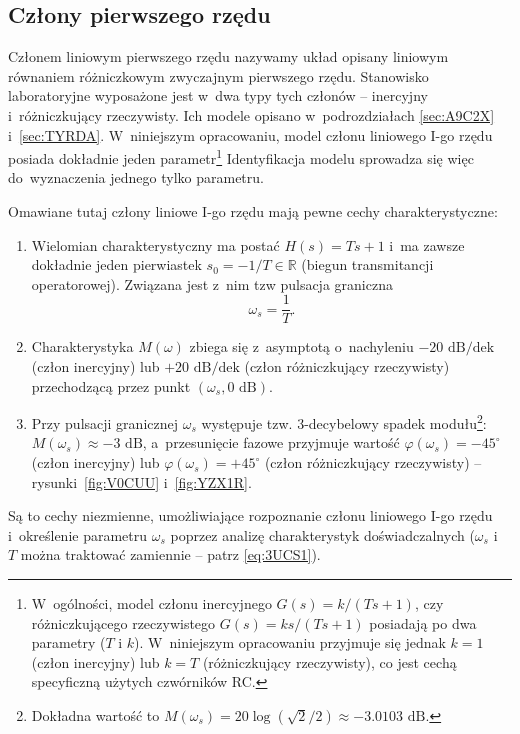 \documentclass[paper=a4,DIV=12]{lpas}
\newcommand{\degree}{^{\circ}}
\begin{document}
\begin{appendices}
  \subsection{Człony pierwszego rzędu}
  \label{sec:LDB7J}

  Członem liniowym pierwszego rzędu nazywamy układ opisany liniowym równaniem
  różniczkowym zwyczajnym pierwszego rzędu. Stanowisko laboratoryjne wyposażone
  jest w~dwa typy tych członów -- inercyjny i~różniczkujący rzeczywisty. Ich
  modele opisano w~podrozdziałach \ref{sec:A9C2X} i~\ref{sec:TYRDA}.
  W~niniejszym opracowaniu, model członu liniowego I-go rzędu posiada dokładnie
  jeden parametr\footnote{W~ogólności, model członu inercyjnego $G(s) = k/(Ts +
  1)$, czy różniczkującego rzeczywistego $G(s) = ks/(Ts + 1)$ posiadają po dwa
  parametry ($T$ i $k$). W~niniejszym opracowaniu przyjmuje się jednak $k = 1$
  (człon inercyjny) lub $k=T$ (różniczkujący rzeczywisty), co jest cechą
  specyficzną użytych czwórników RC.} Identyfikacja modelu sprowadza się więc
  do~wyznaczenia jednego tylko parametru.

  Omawiane tutaj człony liniowe I-go rzędu mają pewne cechy charakterystyczne:
  \begin{enumerate}
    \item Wielomian charakterystyczny ma postać $H(s) = Ts+1$ i~ma zawsze
      dokładnie jeden pierwiastek $s_0 = -1/T \in \mathbb{R}$ (biegun
      transmitancji operatorowej). Związana jest z~nim tzw pulsacja graniczna
      \begin{equation}
        \omega_s = \frac{1}{T}.
        \label{eq:3UCS1}
      \end{equation}
    \item Charakterystyka $M(\omega)$ zbiega się z~asymptotą o~nachyleniu
      $-20\text{ dB/dek}$ (człon inercyjny) lub $+20\text{ dB/dek}$ (człon
      różniczkujący rzeczywisty) przechodzącą przez punkt
      $(\omega_s,0\text{ dB})$.
    \item Przy pulsacji granicznej $\omega_s$ występuje tzw. 3-decybelowy spadek
      modułu\footnote{Dokładna wartość to $M(\omega_s) = 20 \log{(\sqrt{2}/2)}
      \approx -3.0103\text{ dB}$.}: $M(\omega_s) \approx -3\text{ dB}$,
      a~przesunięcie fazowe przyjmuje wartość $\varphi(\omega_s) = -45\degree$
      (człon inercyjny) lub $\varphi(\omega_s) = +45\degree$ (człon
      różniczkujący rzeczywisty) -- rysunki~\ref{fig:V0CUU} i~\ref{fig:YZX1R}.
  \end{enumerate}
  Są to cechy niezmienne, umożliwiające rozpoznanie członu liniowego I-go rzędu
  i~określenie parametru $\omega_s$ poprzez analizę charakterystyk
  doświadczalnych ($\omega_s$ i~$T$ można traktować zamiennie -- patrz \eqref{eq:3UCS1}).


\end{appendices}
\end{document}
